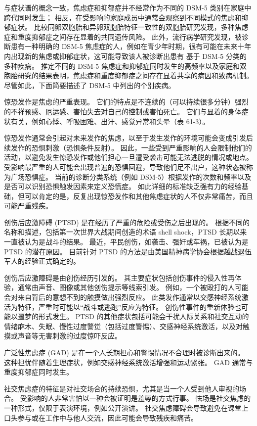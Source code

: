 与症状谱的概念一致，焦虑症和抑郁症并不经常作为不同的 DSM-5 类别在家庭中跨代同时发生； 相反，在受影响的家庭成员中通常会观察到不同模式的焦虑和抑郁症状。 比较同卵双胞胎和异卵双胞胎特征一致性的双胞胎研究发现，多种焦虑症和重度抑郁症之间存在显着的共同遗传风险。 此外，流行病学研究发现，被诊断患有一种明确的 DSM-5 焦虑症的人，例如在青少年时期，很有可能在未来十年内出现新的焦虑或抑郁症状，这可能导致该人被诊断出患有 基于 DSM-5 分类的多种疾病。 推定不同的 DSM-5 焦虑症和抑郁症同时发生的高频率以及家庭和双胞胎研究的结果表明，焦虑症和重度抑郁症之间存在显着共享的病因和致病机制。 尽管如此，下面简要描述了 DSM-5 中列出的个别疾病。

惊恐发作是焦虑的严重表现。 它们的特点是不连续的（可以持续很多分钟）强烈的不祥预感、厄运感、害怕失去对自己的控制或害怕死亡。 它们与显着的身体症状有关，例如心悸、呼吸困难、出汗、感觉异常和头晕（表 61-3）。

惊恐发作通常会引起对未来发作的焦虑，以至于发生发作的环境可能会变成引发后续发作的恐惧刺激（恐惧条件反射）。 因此，一些受到严重影响的人会限制他们的活动，以避免发生惊恐发作或他们担心一旦遭受袭击可能无法逃脱的情况或地点。 受影响最严重的人可能会出现普遍的恐惧回避，导致他们足不出户，这种状态被称为广场恐惧症。 当前的诊断分类系统（例如 DSM-5）根据发作的次数和频率以及是否可以识别恐惧触发因素来定义恐慌症。 如此详细的标准缺乏强有力的经验基础，但可以肯定的是，反复出现惊恐发作和其他焦虑症状的人不仅非常痛苦，而且可能严重残疾。

创伤后应激障碍 (PTSD) 是在经历了严重的危险或受伤之后出现的。 根据不同的名称和描述，包括第一次世界大战期间创造的术语 shell shock，PTSD 长期以来一直被认为是战斗的结果。 最近，平民创伤，如袭击、强奸或车祸，已被认为是 PTSD 的潜在原因。 目前针对 PTSD 的方法是由美国精神病学协会根据越战退伍军人的经验正式确定的。

创伤后应激障碍是由创伤经历引发的。 其主要症状包括创伤事件的侵入性再体验，通常由声音、图像或其他创伤提示等线索引发。 例如，一个被殴打的人可能会对来自背后的意想不到的触摸做出强烈反应。 此类发作通常以交感神经系统激活为特征，严重时可能以“战斗或逃跑”反应为特征。 创伤性事件的重新体验也可能以噩梦的形式发生。 PTSD 的其他症状包括可能会干扰人际关系和社交互动的情绪麻木、失眠、慢性过度警觉（包括过度警惕）、交感神经系统激活，以及对触摸或声音等无害刺激的过度惊吓反应。

广泛性焦虑症 (GAD) 是在一个人长期担心和警惕情况不合理时被诊断出来的。 这种担忧伴随着生理症状，例如交感神经系统激活增强和运动紧张。 GAD 通常与重度抑郁症同时发生。

社交焦虑症的特征是对社交场合的持续恐惧，尤其是当一个人受到他人审视的场合。 受影响的人非常害怕以一种会被证明是羞辱的方式行事。 怯场是社交焦虑的一种形式，仅限于表演环境，例如公开演讲。 社交焦虑障碍会导致避免在课堂上口头参与或在工作中与他人交流，因此可能会导致残疾和痛苦。

